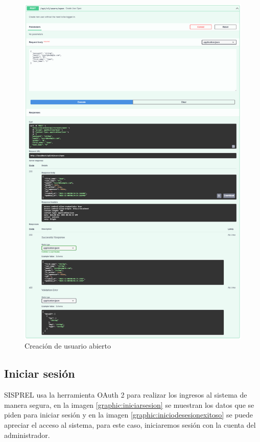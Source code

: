 \begin{figure}[!htb]
    \centering
    \includegraphics[scale=.275]{TT/img/pruebas/test_create_user_open.png}
    \caption{Creación de usuario abierto}
    \label{graphic:TCUO}
\end{figure}

\subsection{Iniciar sesión}
SISPREL usa la herramienta OAuth 2 para realizar los ingresos al sistema de manera segura, en la imagen \ref{graphic:iniciarsesion} se muestran los datos que se piden para iniciar sesión y en la imagen \ref{graphic:iniciodesesionexitoso} se puede apreciar el acceso al sistema, para este caso, iniciaremos sesión con la cuenta del administrador.

